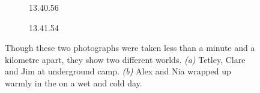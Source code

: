 	\begin{figure}[t]
	\checkoddpage \ifoddpage \forcerectofloat \else \forceversofloat \fi
		\centering
		\begin{subfigure}[t]{0.49\textwidth}
			\centering
			\caption{13.40.56}
			\label{jim tet clare xray}
		\end{subfigure}
	\hfill
		\begin{subfigure}[t]{0.49\textwidth}
			\centering
			\caption{13.41.54}\label{alex nia bivi}
		\end{subfigure}
		\caption{Though these two photographs were taken less than a minute and a kilometre apart, they show two different worlds.
  \textit{(a)} Tetley, Clare and Jim at underground camp. 
  \textit{(b)} Alex and Nia wrapped up warmly in the  on a wet and cold day. }
	\end{figure}



